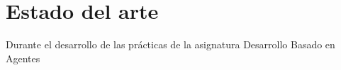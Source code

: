 \chapter{Estado del arte}

Durante el desarrollo de las prácticas de la asignatura Desarrollo Basado en Agentes